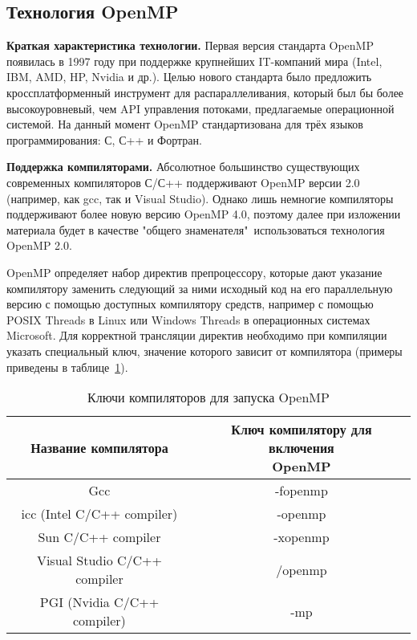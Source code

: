 { %
	\subsection{Технология OpenMP}
	\Large\par\textbf{Краткая характеристика технологии.} Первая версия стандарта OpenMP появилась в 1997 году при поддержке крупнейших IT-компаний мира (Intel, IBM, AMD, HP, Nvidia и др.). Целью нового стандарта было предложить кроссплатформенный инструмент для распараллеливания, который был бы более высокоуровневый, чем API управления потоками, предлагаемые операционной системой. На данный момент OpenMP стандартизована для трёх языков программирования: С, С++ и Фортран.
	\par\textbf{Поддержка компиляторами.} Абсолютное большинство существующих современных компиляторов С/С++ поддерживают OpenMP версии 2.0 (например, как gcc, так и Visual Studio). Однако лишь немногие компиляторы поддерживают более новую версию OpenMP 4.0, поэтому далее при изложении материала будет в качестве "общего знаменателя"\verb+ +использоваться технология OpenMP 2.0.
	\par OpenMP определяет набор директив препроцессору, которые дают указание компилятору заменить следующий за ними исходный код на его параллельную версию с помощью доступных компилятору средств, например с помощью POSIX Threads в Linux или Windows Threads в операционных системах Microsoft. Для корректной трансляции директив необходимо при компиляции указать специальный ключ, значение которого зависит от компилятора (примеры приведены в таблице~\ref{compilerOpenMP:table}).
	\begin{table}[H]
		\Large
		\caption{Ключи компиляторов для запуска OpenMP}
		\label{compilerOpenMP:table}
		\begin{center}
			\begin{tabular}{|c|c|}
				\hline
				\textbf{Название компилятора} & \specialcell{\textbf{Ключ компилятору для включения} \\  \textbf{OpenMP}} \\
				\hline
				Gcc & -fopenmp \\
				\hline
				icc (Intel C/C++ compiler) & -openmp \\
				\hline
				Sun C/C++ compiler & -xopenmp \\
				\hline
				Visual Studio C/C++ compiler & /openmp \\
				\hline
				PGI (Nvidia C/C++ compiler) & -mp \\
				\hline
			\end{tabular}

\end{center}
\end{table}}
